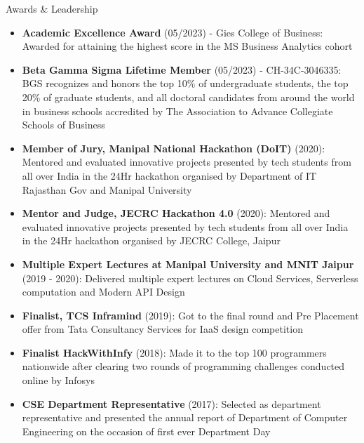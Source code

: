 \documentclass{resume} %
\begin{document}
    \begin{rSection}{Awards \& Leadership}
        \begin{itemize}
            \item \textbf{Academic Excellence Award} (05/2023) - Gies College of Business: Awarded for attaining the highest score in the MS Business Analytics cohort
            \item \textbf{Beta Gamma Sigma Lifetime Member} (05/2023) - CH-34C-3046335: BGS recognizes and honors the top 10\% of undergraduate students, the top 20\% of graduate students, and all doctoral candidates from around the world in business schools accredited by The Association to Advance Collegiate Schools of Business
            \item \textbf{Member of Jury, Manipal National Hackathon (DoIT)} (2020): Mentored and evaluated innovative projects presented by tech students from all over India in the 24Hr hackathon organised by Department of IT Rajasthan Gov and Manipal University
            \item \textbf{Mentor and Judge, JECRC Hackathon 4.0} (2020): Mentored and evaluated innovative projects presented by tech students from all over India in the 24Hr hackathon organised by JECRC College, Jaipur
            \item \textbf{Multiple Expert Lectures at Manipal University and MNIT Jaipur} (2019 - 2020): Delivered multiple expert lectures on Cloud Services, Serverless computation and Modern API Design
            \item \textbf{Finalist, TCS Inframind} (2019): Got to the final round and Pre Placement offer from Tata Consultancy Services for IaaS design competition
            \item \textbf{Finalist HackWithInfy} (2018): Made it to the top 100 programmers nationwide after clearing two rounds of programming challenges conducted online by Infosys
            \item \textbf{CSE Department Representative} (2017): Selected as department representative and presented the annual report of Department of Computer Engineering on the occasion of first ever Department Day
        \end{itemize}
    \end{rSection}
    
\end{document}
